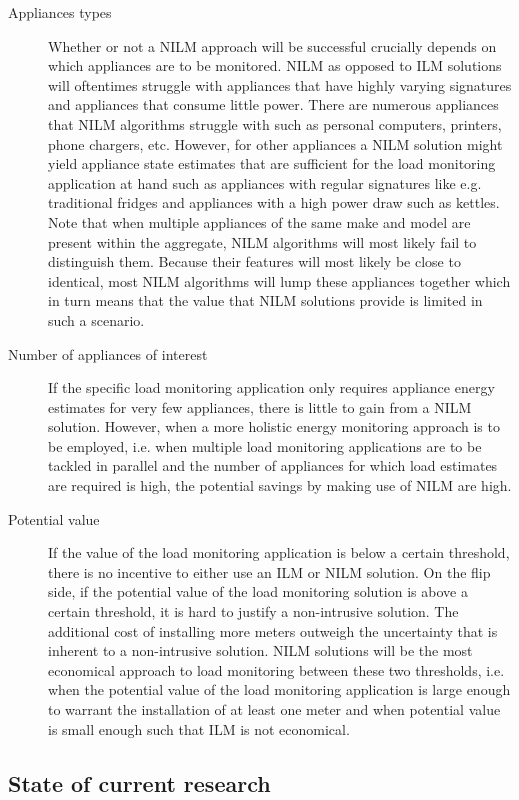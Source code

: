 \documentclass[11pt]{cmuthesis} %
\begin{document}
\begin{description}
\item[Appliances types] Whether or not a NILM approach will be successful crucially depends on which appliances are to be monitored. NILM as opposed to ILM solutions will oftentimes struggle with appliances that have highly varying signatures and appliances that consume little power. There are numerous appliances that NILM algorithms struggle with such as personal computers, printers, phone chargers, etc. However, for other appliances a NILM solution might yield appliance state estimates that are sufficient for the load monitoring application at hand such as appliances with regular signatures like e.g. traditional fridges and appliances with a high power draw such as kettles. Note that when multiple appliances of the same make and model are present within the aggregate, NILM algorithms will most likely fail to distinguish them. Because their features will most likely be close to identical, most NILM algorithms will lump these appliances together which in turn means that the value that NILM solutions provide is limited in such a scenario.
\item[Number of appliances of interest] If the specific load monitoring application only requires appliance energy estimates for very few appliances, there is little to gain from a NILM solution. However, when a more holistic energy monitoring approach is to be employed, i.e. when multiple load monitoring applications are to be tackled in parallel and the number of appliances for which load estimates are required is high, the potential savings by making use of NILM are high.
\item[Potential value] If the value of the load monitoring application is below a certain threshold, there is no incentive to either use an ILM or NILM solution. On the flip side, if the potential value of the load monitoring solution is above a certain threshold, it is hard to justify a non-intrusive solution. The additional cost of installing more meters outweigh the uncertainty that is inherent to a non-intrusive solution. NILM solutions will be the most economical approach to load monitoring between these two thresholds, i.e. when the potential value of the load monitoring application is large enough to warrant the installation of at least one meter and when potential value is small enough such that ILM is not economical.
\end{description}
\fi



\subsection{State of current research}
\end{document}
